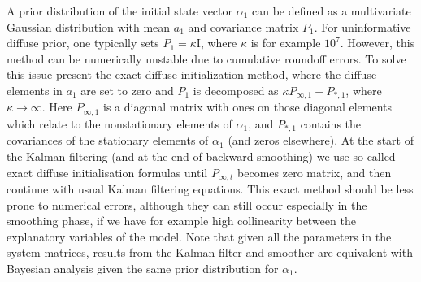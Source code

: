 \documentclass[nojss,article]{jss}\usepackage[]{graphicx}\usepackage[]{color}
\begin{document}
A prior distribution of the initial state vector $\alpha_1$ can be defined as a multivariate Gaussian distribution with mean $a_1$ and covariance matrix $P_1$. For uninformative diffuse prior, one typically sets $P_1 = \kappa\textrm{I}$, where $\kappa$ is for example $10^7$. However, this method can be numerically unstable due to cumulative roundoff errors. To solve this issue \citet{KD2003} present the exact diffuse initialization method, where the diffuse elements in $a_1$ are set to zero and $P_1$ is decomposed as $\kappa P_{\infty,1} + P_{*,1}$, where $\kappa\to\infty$. Here $P_{\infty,1}$ is a diagonal matrix with ones on those diagonal elements which relate to the nonstationary elements of $\alpha_1$, and $P_{*,1}$ contains the covariances of the stationary elements of $\alpha_1$ (and zeros elsewhere). At the start of the Kalman filtering (and at the end of backward smoothing) we use so called exact diffuse initialisation formulas until $P_{\infty,t}$ becomes zero matrix, and then continue with usual Kalman filtering equations. This exact method should be less prone to numerical errors, although they can still occur especially in the smoothing phase, if we have for example high collinearity between the explanatory variables of the model. Note that given all the parameters in the system matrices, results from the Kalman filter and smoother are equivalent with Bayesian analysis given the same prior distribution for $\alpha_1$.
\end{document}
